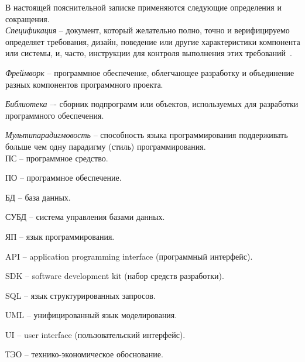 \label{sec:definitions}

В настоящей пояснительной записке применяются следующие определения и сокращения.
\\

\emph{Спецификация} -- документ, который желательно полно, точно и верифицируемо определяет требования, дизайн, поведение или другие характеристики компонента или системы, и, часто, инструкции для контроля выполнения этих требований~\cite{istqb_specification}.


\emph{Фреймворк} -- программное обеспечение, облегчающее разработку и объединение разных компонентов программного проекта.

\emph{Библиотека} –- сборник подпрограмм или объектов, используемых для разработки программного обеспечения.

\emph{Мультипарадигмовость} -- способность языка программирования поддерживать больше чем одну парадигму (стиль) программирования.
\\

ПС -- программное средство.

ПО -- программное обеспечение.

БД -- база данных.

СУБД -- система управления базами данных.

ЯП -- язык программирования.

API -- application programming interface (программный интерфейс).

SDK -- software development kit (набор средств разработки).

SQL – язык структурированных запросов.

UML – унифицированный язык моделирования.

UI -- user interface (пользовательский интерфейс).

ТЭО -- технико-экономическое обоснование.
